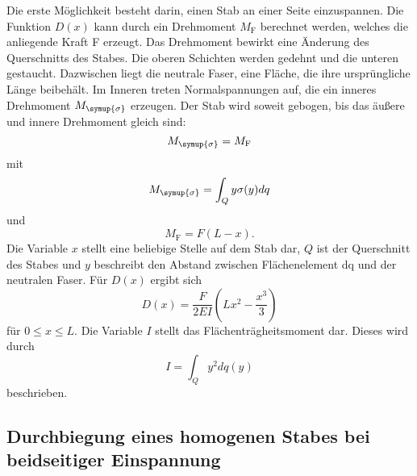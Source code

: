    Die erste Möglichkeit besteht darin, einen Stab an einer Seite einzuspannen.
    Die Funktion $D(x)$ kann durch ein Drehmoment $M_\text{F}$ berechnet werden, welches die anliegende Kraft F erzeugt.
    Das Drehmoment bewirkt eine Änderung des Querschnitts des Stabes. Die oberen Schichten werden gedehnt und die unteren
    gestaucht. Dazwischen liegt die neutrale Faser, eine Fläche, die ihre ursprüngliche Länge beibehält.
    Im Inneren treten Normalspannungen auf, die ein inneres Drehmoment $M_{\symup{\sigma}}$ erzeugen. 
    Der Stab wird soweit gebogen, bis das äußere und innere Drehmoment gleich sind: 
    \begin{equation}
        M_{\symup{\sigma}} = M_\text{F}
    \end{equation}
    mit 
    \begin{equation}
        M_{\symup{\sigma}} = \int_Q y\sigma(y) dq 
    \end{equation}
    und
    \begin{equation}
        M_\text{F} = F (L-x) .
    \end{equation}
    Die Variable $x$ stellt eine beliebige Stelle auf dem Stab dar, $Q$ ist der Querschnitt des Stabes und $y$ beschreibt den 
    Abstand zwischen Flächenelement dq und der neutralen Faser.
    Für $D(x)$ ergibt sich 
    \begin{equation}
        D(x) = \frac{F}{2EI} \left(Lx^2 - \frac{x^3}{3}\right) \label{eqn:einsD}
    \end{equation}
    für $0 \leq x \leq L$. Die Variable $I$ stellt das Flächenträgheitsmoment dar.
    Dieses wird durch
    \begin{equation}
        I = \int_Q y^2 dq(y)
    \end{equation} 
    beschrieben.

\subsection{Durchbiegung eines homogenen Stabes bei beidseitiger Einspannung} \label{sec:beidseitig}

